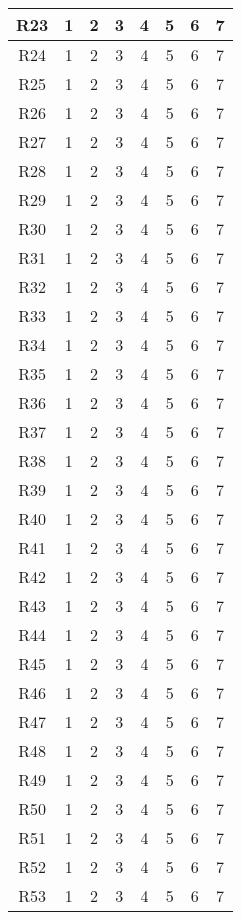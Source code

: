 \begin{longtable}{|c|c|c|c|c|c|c|c|}
    R23 & 1 & 2 & 3 & 4 & 5 & 6 & 7 \\ \hline
    R24 & 1 & 2 & 3 & 4 & 5 & 6 & 7 \\ \hline
    R25 & 1 & 2 & 3 & 4 & 5 & 6 & 7 \\ \hline
    R26 & 1 & 2 & 3 & 4 & 5 & 6 & 7 \\ \hline
    R27 & 1 & 2 & 3 & 4 & 5 & 6 & 7 \\ \hline
    R28 & 1 & 2 & 3 & 4 & 5 & 6 & 7 \\ \hline
    R29 & 1 & 2 & 3 & 4 & 5 & 6 & 7 \\ \hline
    R30 & 1 & 2 & 3 & 4 & 5 & 6 & 7 \\ \hline
    R31 & 1 & 2 & 3 & 4 & 5 & 6 & 7 \\ \hline
    R32 & 1 & 2 & 3 & 4 & 5 & 6 & 7 \\ \hline
    R33 & 1 & 2 & 3 & 4 & 5 & 6 & 7 \\ \hline
    R34 & 1 & 2 & 3 & 4 & 5 & 6 & 7 \\ \hline
    R35 & 1 & 2 & 3 & 4 & 5 & 6 & 7 \\ \hline
    R36 & 1 & 2 & 3 & 4 & 5 & 6 & 7 \\ \hline
    R37 & 1 & 2 & 3 & 4 & 5 & 6 & 7 \\ \hline
    R38 & 1 & 2 & 3 & 4 & 5 & 6 & 7 \\ \hline
    R39 & 1 & 2 & 3 & 4 & 5 & 6 & 7 \\ \hline
    R40 & 1 & 2 & 3 & 4 & 5 & 6 & 7 \\ \hline
    R41 & 1 & 2 & 3 & 4 & 5 & 6 & 7 \\ \hline
    R42 & 1 & 2 & 3 & 4 & 5 & 6 & 7 \\ \hline
    R43 & 1 & 2 & 3 & 4 & 5 & 6 & 7 \\ \hline
    R44 & 1 & 2 & 3 & 4 & 5 & 6 & 7 \\ \hline
    R45 & 1 & 2 & 3 & 4 & 5 & 6 & 7 \\ \hline
    R46 & 1 & 2 & 3 & 4 & 5 & 6 & 7 \\ \hline
    R47 & 1 & 2 & 3 & 4 & 5 & 6 & 7 \\ \hline
    R48 & 1 & 2 & 3 & 4 & 5 & 6 & 7 \\ \hline
    R49 & 1 & 2 & 3 & 4 & 5 & 6 & 7 \\ \hline
    R50 & 1 & 2 & 3 & 4 & 5 & 6 & 7 \\ \hline
    R51 & 1 & 2 & 3 & 4 & 5 & 6 & 7 \\ \hline
    R52 & 1 & 2 & 3 & 4 & 5 & 6 & 7 \\ \hline
    R53 & 1 & 2 & 3 & 4 & 5 & 6 & 7 \\ \hline

\end{longtable}
